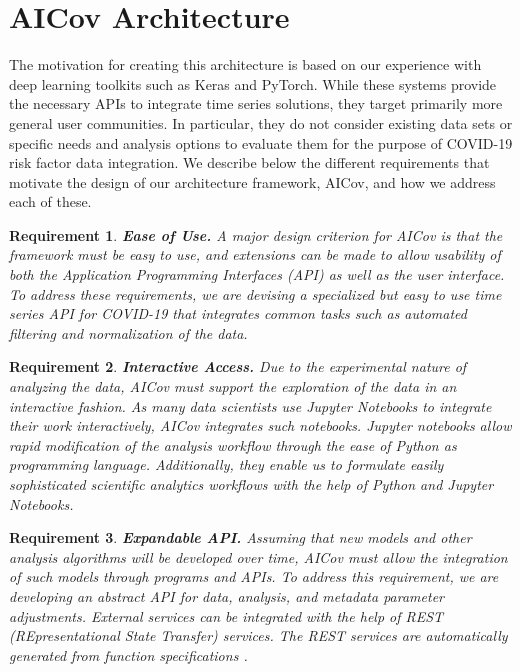 \documentclass[a4paper, inpress]{jds} %
\renewcommand{\_}{%
    \textunderscore\hspace{0pt}%
}
\newtheorem{requirement}{Requirement}
\begin{document}
\section{AICov Architecture}
\label{sec:arch}

The motivation for creating this architecture is based on our
experience with deep learning toolkits such as Keras and
PyTorch. While these systems provide the necessary APIs to integrate
time series solutions, they target primarily more general user
communities. In particular, they do not consider existing data sets or
specific needs and analysis options to evaluate them for the purpose
of COVID-19 risk factor data integration. We describe below the
different requirements that motivate the design of our architecture
framework, AICov, and how we address each of these.

\newcommand{\Solution}{}

\begin{requirement}{\bf Ease of Use.} \normalfont
  A major design criterion for AICov is that the framework must be
  easy to use, and extensions can be made to allow usability of both
  the Application Programming Interfaces (API) as well as the user
  interface. \Solution To address these requirements, we are devising
  a specialized but easy to use time series API for COVID-19 that
  integrates common tasks such as automated filtering and
  normalization of the data.
\end{requirement}


\begin{requirement}{\bf Interactive Access.} \normalfont
  Due to the experimental nature of analyzing the data, AICov must
  support the exploration of the data in an interactive
  fashion. \Solution As many data scientists use Jupyter Notebooks to
  integrate their work interactively, AICov integrates such
  notebooks. Jupyter notebooks allow rapid modification of the
  analysis workflow through the ease of Python as programming
  language. Additionally, they enable us to formulate easily
  sophisticated scientific analytics workflows with the help of
  Python and Jupyter Notebooks.
\end{requirement}


\begin{requirement}{\bf Expandable API.} \normalfont
  Assuming that new models and other analysis algorithms will be
  developed over time, AICov must allow the integration of such
  models through programs and APIs. \Solution To address this 
  requirement, we are developing an
  abstract API for data, analysis, and metadata parameter
  adjustments. External services can be integrated with the help of
  REST (REpresentational State Transfer) services. The REST services
  are automatically generated from function specifications \citep{las-19-openapi-function}.
\end{requirement}
\end{document}
